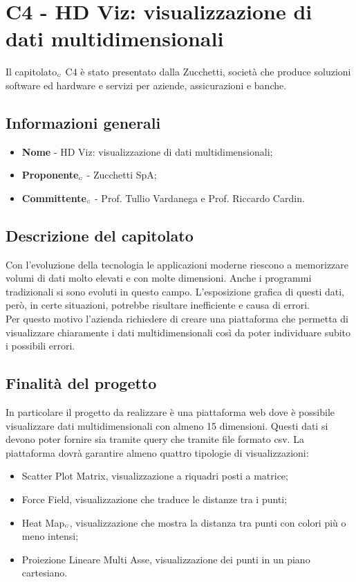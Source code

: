 \chapter{C4 - HD Viz: visualizzazione di dati multidimensionali} \label{CapitolatoC4}
Il capitolato$_{\scaleto{G}{3pt}}$ C4 è stato presentato dalla Zucchetti, società che produce soluzioni software ed hardware e servizi per aziende, assicurazioni e banche.
\section{Informazioni generali} \label{C4InformazioniGenerali}
\begin{itemize}
	\item \textbf{Nome} - HD Viz: visualizzazione di dati multidimensionali;
	\item \textbf{Proponente}$_{\scaleto{G}{3pt}}$ - Zucchetti SpA;
	\item \textbf{Committente}$_{\scaleto{G}{3pt}}$ - Prof. Tullio Vardanega e Prof. Riccardo Cardin.
\end{itemize}
\section{Descrizione del capitolato} \label{C4DescrizioneDelCapitolato}
Con l'evoluzione della tecnologia le applicazioni moderne riescono a memorizzare volumi di dati molto elevati e con molte dimensioni. Anche i programmi tradizionali si sono evoluti in questo campo. L'esposizione grafica di questi dati, però, in certe situazioni, potrebbe risultare inefficiente e causa di errori. \\
Per questo motivo l'azienda richiedere di creare una piattaforma che permetta di visualizzare chiaramente i dati multidimensionali così da poter individuare subito i possibili errori.
\section{Finalità del progetto} \label{C4FinalitàDelProgetto}
In particolare il progetto da realizzare è una piattaforma web dove è possibile visualizzare dati multidimensionali con almeno 15 dimensioni. Questi dati si devono poter fornire sia tramite query che tramite file formato csv. La piattaforma dovrà garantire almeno quattro tipologie di visualizzazioni:
\begin{itemize}
	\item Scatter Plot Matrix, visualizzazione a riquadri posti a matrice;
	\item Force Field, visualizzazione che traduce le distanze tra i punti;
	\item Heat Map$_{\scaleto{G}{3pt}}$, visualizzazione che mostra la distanza tra punti con colori più o meno intensi;
	\item Proiezione Lineare Multi Asse, visualizzazione dei punti in un piano cartesiano.
\end{itemize}
